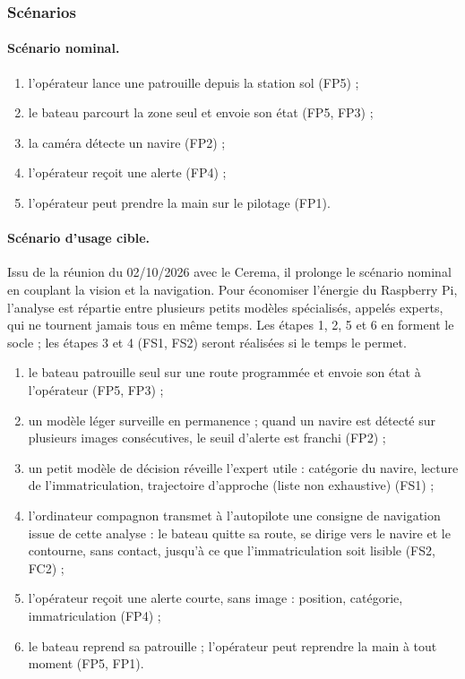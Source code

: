 \subsubsection{Scénarios}
\label{sec:scenarios}

\paragraph{Scénario nominal.} 
\begin{enumerate}
  \item l'opérateur lance une patrouille depuis la station sol (FP5) ;
  \item le bateau parcourt la zone seul et envoie son état (FP5, FP3) ;
  \item la caméra détecte un navire (FP2) ;
  \item l'opérateur reçoit une alerte (FP4) ;
  \item l'opérateur peut prendre la main sur le pilotage (FP1).
\end{enumerate}

\paragraph{Scénario d'usage cible.} Issu de la réunion du 02/10/2026 avec le Cerema, il prolonge le scénario nominal en couplant la vision et la navigation. Pour économiser l'énergie du Raspberry Pi, l'analyse est répartie entre plusieurs petits modèles spécialisés, appelés experts, qui ne tournent jamais tous en même temps. Les étapes 1, 2, 5 et 6 en forment le socle ; les étapes 3 et 4 (FS1, FS2) seront réalisées si le temps le permet.
\begin{enumerate}
  \item le bateau patrouille seul sur une route programmée et envoie son état à l'opérateur (FP5, FP3) ;
  \item un modèle léger surveille en permanence ; quand un navire est détecté sur plusieurs images consécutives, le seuil d'alerte est franchi (FP2) ;
  \item un petit modèle de décision réveille l'expert utile : catégorie du navire, lecture de l'immatriculation, trajectoire d'approche (liste non exhaustive) (FS1) ;
  \item l'ordinateur compagnon transmet à l'autopilote une consigne de navigation issue de cette analyse : le bateau quitte sa route, se dirige vers le navire et le contourne, sans contact, jusqu'à ce que l'immatriculation soit lisible (FS2, FC2) ;
  \item l'opérateur reçoit une alerte courte, sans image : position, catégorie, immatriculation (FP4) ;
  \item le bateau reprend sa patrouille ; l'opérateur peut reprendre la main à tout moment (FP5, FP1).
\end{enumerate}

